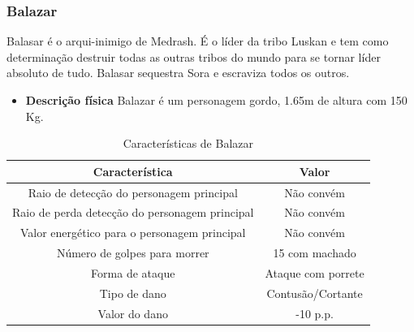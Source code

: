 \subsubsection{Balazar}
Balasar é o arqui-inimigo de Medrash. É o líder da tribo Luskan e tem como determinação destruir todas as outras tribos do mundo para se tornar líder absoluto de tudo. Balasar sequestra Sora e escraviza todos os outros.
\begin{itemize}
\item {\bf Descrição física}
Balazar é um personagem gordo, 1.65m de altura com 150 Kg.
\end{itemize}
\newpage
\begin{table}[ht]
\begin{center}
\begin{tabular}{|c|c|}
\hline 
\textbf{Característica} & \textbf{Valor} \\ 
\hline 
Raio de detecção do personagem principal & Não convém \\ 
\hline 
Raio de perda detecção do personagem principal & Não convém \\ 
\hline 
Valor energético para o personagem principal & Não convém \\ 
\hline 
Número de golpes para morrer & 15 com machado\\ 
\hline 
Forma de ataque & Ataque com porrete\\ 
\hline 
Tipo de dano &  Contusão/Cortante \\ 
\hline 
Valor do dano & -10 p.p. \\ 
\hline 
\end{tabular} 
\end{center}
\caption{Características de Balazar}
\label{table:balazar}
\end{table}
